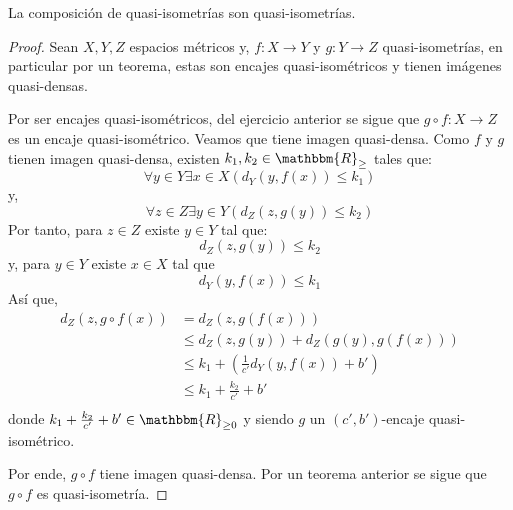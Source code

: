 \documentclass[12pt]{report}
\newcounter{it}
\theoremstyle{largebreak}
\newcommand\cf[3]{\ensuremath{#1:#2\rightarrow#3}}
\newcommand{\bbm}[1]{\ensuremath{\mathbbm{#1}}}
\begin{document}
    \begin{excer}
        La composición de quasi-isometrías son quasi-isometrías.    
    \end{excer}

    \begin{proof}
        Sean $X,Y,Z$ espacios métricos y, $\cf{f}{X}{Y}$ y $\cf{g}{Y}{Z}$ quasi-isometrías, en particular por un teorema, estas son encajes quasi-isométricos y tienen imágenes quasi-densas.

        Por ser encajes quasi-isométricos, del ejercicio anterior se sigue que $\cf{g\circ f}{X}{Z}$ es un encaje quasi-isométrico. Veamos que tiene imagen quasi-densa. Como $f$ y $g$ tienen imagen quasi-densa, existen $k_1,k_2\in\bbm{R}_{\geq}$ tales que:
        \begin{equation*}
            \forall y\in Y\exists x\in X (d_Y(y,f(x))\leq k_1)
        \end{equation*}
        y,
        \begin{equation*}
            \forall z\in Z\exists y\in Y( d_Z(z,g(y))\leq k_2)
        \end{equation*}
        Por tanto, para $z\in Z$ existe $y\in Y$ tal que:
        \begin{equation*}
            d_Z(z,g(y))\leq k_2
        \end{equation*}
        y, para $y\in Y$ existe $x\in X$ tal que
        \begin{equation*}
            d_Y(y,f(x))\leq k_1
        \end{equation*}
        Así que,
        \begin{equation*}
            \begin{split}
                d_Z(z,g\circ f(x))&=d_Z(z,g(f(x)))\\
                &\leq d_Z(z,g(y))+d_Z(g(y),g(f(x)))\\
                &\leq k_1+\left(\frac{1}{c'}d_Y(y,f(x))+b'\right)\\
                &\leq k_1+\frac{k_2}{c'}+b'\\ 
            \end{split}
        \end{equation*}
        donde $k_1+\frac{k_2}{c'}+b'\in\bbm{R}_{\geq0}$ y siendo $g$ un $(c',b')$-encaje quasi-isométrico.

        Por ende, $g\circ f$ tiene imagen quasi-densa. Por un teorema anterior se sigue que $g\circ f$ es quasi-isometría.
    \end{proof}
    
\end{document}
